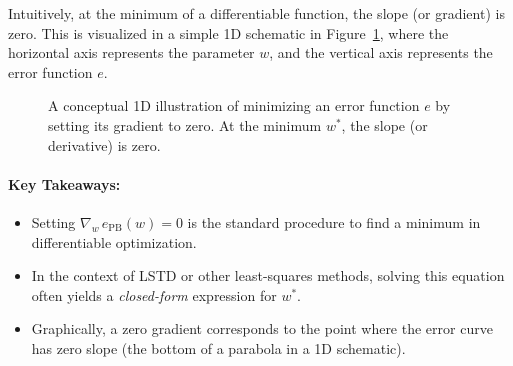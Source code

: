Intuitively, at the minimum of a differentiable function, the slope (or gradient) is zero. This is
visualized in a simple 1D schematic in Figure~\ref{fig:grad_zero}, where the horizontal axis 
represents the parameter \(w\), and the vertical axis represents the error function \(e\). 

\begin{figure}[ht]
\centering
{}
\caption{A conceptual 1D illustration of minimizing an error function $e$ by setting its gradient to zero. 
At the minimum $w^*$, the slope (or derivative) is zero.}
\label{fig:grad_zero}
\end{figure}

\paragraph{Key Takeaways:}
\begin{itemize}
    \item Setting \(\nabla_w \, e_{\mathrm{PB}}(w) = 0\) is the standard procedure to find a minimum in differentiable optimization.
    \item In the context of LSTD or other least-squares methods, solving this equation often yields a \emph{closed-form} expression for \(w^*\).
    \item Graphically, a zero gradient corresponds to the point where the error curve has zero slope (the bottom of a parabola in a 1D schematic).
\end{itemize}
